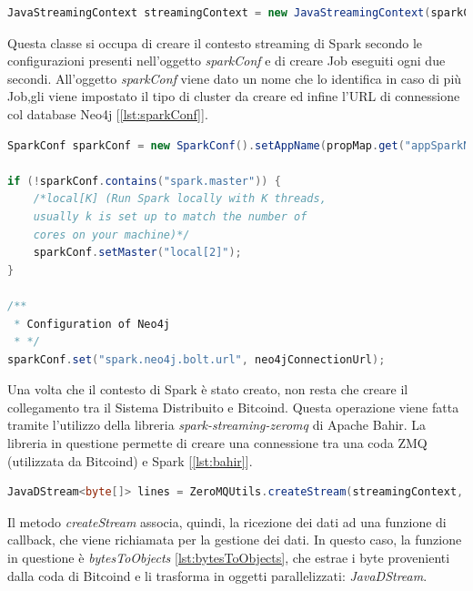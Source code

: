 \begin{itemize}
\begin{lstlisting}[language=Java, label=lst:intiSpark, caption={Inizializzazione Spark Streaming.}]
JavaStreamingContext streamingContext = new JavaStreamingContext(sparkConf, new Duration(2000));
\end{lstlisting}

Questa classe si occupa di creare il contesto streaming di Spark secondo le configurazioni presenti nell'oggetto \textit{sparkConf} e di creare Job eseguiti ogni due secondi. All'oggetto \textit{sparkConf} viene dato un nome che lo identifica in caso di più Job,gli viene impostato il tipo di cluster da creare ed infine l'URL di connessione col database Neo4j [\ref{lst:sparkConf}].

\begin{lstlisting}[language=Java, label=lst:sparkConf, caption={Creazione oggetto sparkConf.}]
SparkConf sparkConf = new SparkConf().setAppName(propMap.get("appSparkName"));
					
if (!sparkConf.contains("spark.master")) {
	/*local[K] (Run Spark locally with K threads, 
	usually k is set up to match the number of 
	cores on your machine)*/
	sparkConf.setMaster("local[2]"); 
}

/**
 * Configuration of Neo4j
 * */
sparkConf.set("spark.neo4j.bolt.url", neo4jConnectionUrl);
\end{lstlisting}

Una volta che il contesto di Spark è stato creato, non resta che creare il collegamento tra il Sistema Distribuito e Bitcoind. Questa operazione viene fatta tramite l'utilizzo della libreria \textit{spark-streaming-zeromq} di Apache Bahir. La libreria in questione permette di creare una connessione tra una coda ZMQ (utilizzata da Bitcoind) e Spark [\ref{lst:bahir}].

\begin{lstlisting}[language=Java, label=lst:bahir, caption={Metodo della libreria Spark Streaming ZeroMQ.}]
JavaDStream<byte[]> lines = ZeroMQUtils.createStream(streamingContext, host, subscribe, bytesToObjects );
\end{lstlisting}

Il metodo \textit{createStream} associa, quindi, la ricezione dei dati ad una funzione di callback, che viene richiamata per la gestione dei dati. In questo caso, la funzione in questione è \textit{bytesToObjects} \ref{lst:bytesToObjects}, che estrae i byte provenienti dalla coda di Bitcoind e li trasforma in oggetti parallelizzati: \textit{JavaDStream}.


\end{itemize}
